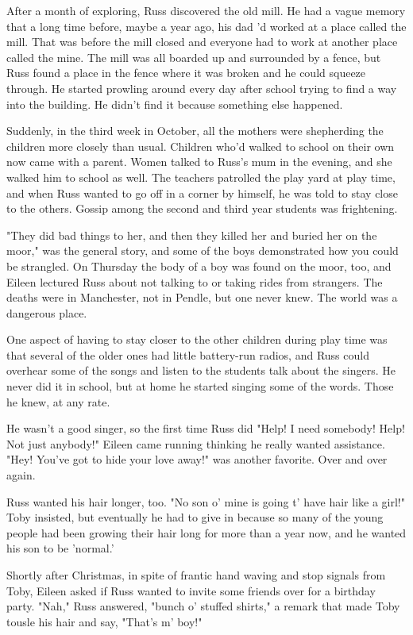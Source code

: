 \documentclass[a4paper,11pt]{article}
\begin{document}
After a month of exploring, Russ discovered the old mill. He had a vague memory that a long time before, maybe a year ago, his dad 'd worked at a place called the mill. That was before the mill closed and everyone had to work at another place called the mine. The mill was all boarded up and surrounded by a fence, but Russ found a place in the fence where it was broken and he could squeeze through. He started prowling around every day after school trying to find a way into the building. He didn't find it because something else happened.

Suddenly, in the third week in October, all the mothers were shepherding the children more closely than usual. Children who'd walked to school on their own now came with a parent. Women talked to Russ's mum in the evening, and she walked him to school as well. The teachers patrolled the play yard at play time, and when Russ wanted to go off in a corner by himself, he was told to stay close to the others. Gossip among the second and third year students was frightening.

"They did bad things to her, and then they killed her and buried her on the moor," was the general story, and some of the boys demonstrated how you could be strangled. On Thursday the body of a boy was found on the moor, too, and Eileen lectured Russ about not talking to or taking rides from strangers. The deaths were in Manchester, not in Pendle, but one never knew. The world was a dangerous place.

One aspect of having to stay closer to the other children during play time was that several of the older ones had little battery-run radios, and Russ could overhear some of the songs and listen to the students talk about the singers. He never did it in school, but at home he started singing some of the words. Those he knew, at any rate.

He wasn't a good singer, so the first time Russ did "Help! I need somebody! Help! Not just anybody!" Eileen came running thinking he really wanted assistance. "Hey! You've got to hide your love away!" was another favorite. Over and over again.

Russ wanted his hair longer, too. "No son o' mine is going t' have hair like a girl!" Toby insisted, but eventually he had to give in because so many of the young people had been growing their hair long for more than a year now, and he wanted his son to be 'normal.'

Shortly after Christmas, in spite of frantic hand waving and stop signals from Toby, Eileen asked if Russ wanted to invite some friends over for a birthday party. "Nah," Russ answered, "bunch o' stuffed shirts," a remark that made Toby tousle his hair and say, "That's m' boy!"
\end{document}

